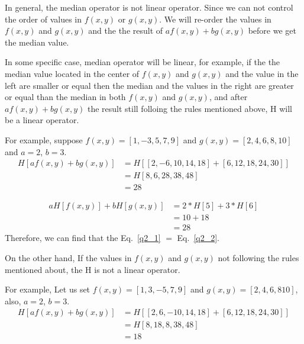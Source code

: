 \documentclass[12pt]{article}
\begin{document}
\begin{enumerate}[leftmargin=\labelsep]
\vspace*{1em}
In general, the median operator is not linear operator.
Since we can not control the order of values in $f(x,y)$ or $g(x,y)$.
We will re-order the values in $f(x,y)$ and $g(x,y)$ and the the result of $af(x,y) + bg(x,y)$ before we get the median value.

In some specific case, median operator will be linear, for example, if the the median value located in the center of $f(x,y)$ and $g(x,y)$ and the value in the left are smaller or equal then the median and the values in the right are greater or equal than the median in both $f(x,y)$ and $g(x,y)$, and after $af(x,y) + bg(x,y)$ the result still folloing the rules mentioned above, H will be a linear operator.

For example, suppose $f(x,y) = [1, -3, 5, 7, 9]$ and $g(x,y) = [2,4,6,8,10]$ and $a = 2$, $b = 3$. 
        \begin{equation}
        \begin{aligned}
        H[af(x,y) + bg(x,y)]
        &= H[[2, -6, 10, 14, 18] + [6, 12, 18, 24, 30]]\\
        &= H[8, 6, 28, 38, 48]\\
        &= 28
        \label{q2_1}
        \end{aligned}
        \end{equation}
        
        \begin{equation}
        \begin{aligned}
        aH[f(x,y)] + bH[g(x,y)]
        &= 2*H[5] + 3*H[6]\\
        &= 10 + 18\\
        &= 28
        \label{q2_2}
        \end{aligned}
        \end{equation}
Therefore, we can find that the Eq.~\ref{q2_1} $=$ Eq.~\ref{q2_2}.        

On the other hand, If the values in $f(x,y)$ and $g(x,y)$ not following the rules mentioned about, the H is not a linear operator.

For example, Let us set $f(x,y) = [1, 3, -5, 7, 9]$ and $g(x,y) = [2, 4, 6, 8 10]$, also, $a = 2$, $b = 3$.
        \begin{equation}
        \begin{aligned}
        H[af(x,y) + bg(x,y)]
        &= H[[2, 6, -10, 14, 18] + [6, 12, 18, 24, 30]]\\
        &= H[8, 18, 8, 38,48]\\
        &= 18
        \label{q2_3}
        \end{aligned}
        \end{equation}
        

\end{enumerate}
\end{document}
